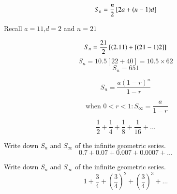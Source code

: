\documentclass[12pt]{article}
\begin{document}
\[ \phantom{S_n  = {21 \over 2} \left[ (2.11) +[(21-1)2] \right]} \]
\[ \phantom{S_n  = 10.5 \left[ 22 + 40 \right]  = 10.5 \times 62}\]
\[ \phantom{S_n  = 651} \] 




\[ S_n  = {n \over 2} \left[ 2a+(n-1)d \right] \]

Recall $a=11$,$d=2$ and $n=21$


\[ S_n  = {21 \over 2} \left[ (2.11) +[(21-1)2] \right] \]
\[ S_n  = 10.5 \left[ 22 + 40 \right]  = 10.5 \times 62\]
\[ S_n  = 651 \] 

\newpage








{

\[ S_n = \frac{a(1-r)^n}{1-r} \]
}
{

\[ \mbox{ when } 0 < r < 1 : S_{\infty} = \frac{a}{1-r} \]
}



\[ \frac{1}{2} + \frac{1}{4} + \frac{1}{8} +  \frac{1}{16} +\ldots  \]






Write down $S_n$ and $S_{\infty}$ of the infinite geometric series.
\[ 0.7 + 0.07 + 0.007 + 0.0007 + \ldots  \]






Write down $S_n$ and $S_{\infty}$ of the infinite geometric series.
\[ 1 + \frac{3}{4} + \left( \frac{3}{4} \right)^2 + \left( \frac{3}{4} \right)^3 + \ldots  \]
\end{document}
